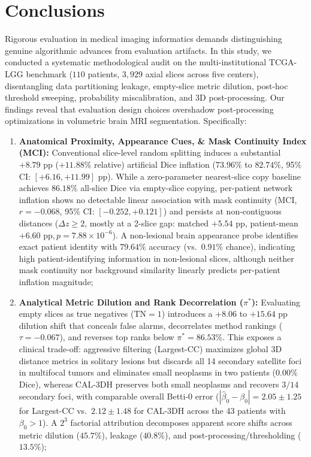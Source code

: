 \documentclass[11pt,a4paper]{article}
\begin{document}
\section{Conclusions}
\label{sec:conclusion}
Rigorous evaluation in medical imaging informatics demands distinguishing genuine algorithmic advances from evaluation artifacts. In this study, we conducted a systematic methodological audit on the multi-institutional TCGA-LGG benchmark ($110$ patients, $3,929$ axial slices across five centers), disentangling data partitioning leakage, empty-slice metric dilution, post-hoc threshold sweeping, probability miscalibration, and 3D post-processing. Our findings reveal that evaluation design choices overshadow post-processing optimizations in volumetric brain MRI segmentation. Specifically:
\begin{enumerate}\setlength{\itemsep}{0pt}\setlength{\parskip}{0pt}\setlength{\parsep}{0pt}
    \item \textbf{Anatomical Proximity, Appearance Cues, \& Mask Continuity Index (MCI):} Conventional slice-level random splitting induces a substantial $+8.79\text{ pp}$ ($+11.88\%$ relative) artificial Dice inflation ($73.96\%$ to $82.74\%$, 95\% CI: $[+6.16, +11.99]\text{ pp}$). While a zero-parameter nearest-slice copy baseline achieves $86.18\%$ all-slice Dice via empty-slice copying, per-patient network inflation shows no detectable linear association with mask continuity ($\text{MCI}$, $r = -0.068$, 95\% CI: $[-0.252, +0.121]$) and persists at non-contiguous distances ($\Delta z \ge 2$, mostly at a 2-slice gap: matched $+5.54\text{ pp}$, patient-mean $+6.60\text{ pp}, p = 7.88 \times 10^{-6}$). A non-lesional brain appearance probe identifies exact patient identity with $79.64\%$ accuracy (vs.\ $0.91\%$ chance), indicating high patient-identifying information in non-lesional slices, although neither mask continuity nor background similarity linearly predicts per-patient inflation magnitude;
    \item \textbf{Analytical Metric Dilution and Rank Decorrelation ($\pi^*$):} Evaluating empty slices as true negatives ($\text{TN}=1$) introduces a $+8.06$ to $+15.64\text{ pp}$ dilution shift that conceals false alarms, decorrelates method rankings ($\tau = -0.067$), and reverses top ranks below $\pi^* = 86.53\%$. This exposes a clinical trade-off: aggressive filtering (Largest-CC) maximizes global 3D distance metrics in solitary lesions but discards all 14 secondary satellite foci in multifocal tumors and eliminates small neoplasms in two patients ($0.00\%$ Dice), whereas CAL-3DH preserves both small neoplasms and recovers $3/14$ secondary foci, with comparable overall Betti-0 error ($|\hat{\beta}_0 - \beta_0| = 2.05 \pm 1.25$ for Largest-CC vs.\ $2.12 \pm 1.48$ for CAL-3DH across the 43 patients with $\beta_0 > 1$). A $2^3$ factorial attribution decomposes apparent score shifts across metric dilution ($45.7\%$), leakage ($40.8\%$), and post-processing/thresholding ($13.5\%$);


\end{enumerate}
\end{document}
